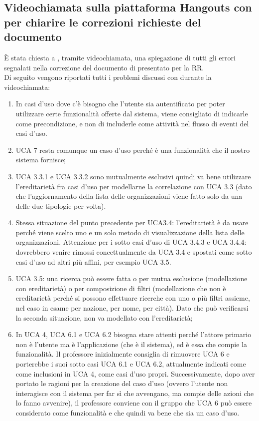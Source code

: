 \subsection{Videochiamata sulla piattaforma Hangouts con \CR{} per chiarire le correzioni richieste del documento }
È stata chiesta a \CR{}, tramite videochiamata, una spiegazione di tutti gli errori segnalati nella correzione del documento di \AdR{} presentato per la RR.\\
Di seguito vengono riportati tutti i problemi discussi con \CR{} durante la videochiamata:
\begin{enumerate}
	\item In casi d'uso dove c'è bisogno che l'utente sia autentificato per poter utilizzare certe funzionalità offerte dal sistema, viene consigliato di indicarle come precondizione, e non di includerle come attività nel flusso di eventi del casi d'uso.
	\item UCA 7 resta comunque un caso d'uso perché è una funzionalità che il nostro sistema fornisce;
	\item UCA 3.3.1 e UCA 3.3.2 sono mutualmente esclusivi quindi va bene utilizzare l'ereditarietà fra casi d'uso per modellarne la correlazione con UCA 3.3
	(dato che l'aggiornamento della lista delle organizzazioni viene fatto solo da una delle due tipologie per volta).
	\item Stessa situazione del punto precedente per UCA3.4: l'ereditarietà è da usare perché viene scelto uno e un solo metodo di visualizzazione della lista delle organizzazioni.
	Attenzione per i sotto casi d'uso di UCA 3.4.3 e UCA 3.4.4: dovrebbero venire rimossi concettualmente da UCA 3.4 e spostati come sotto casi d'uso ad altri più affini, per esempio UCA 3.5.
	\item UCA 3.5: una ricerca può essere fatta o per mutua esclusione (modellazione con ereditarietà) o per composizione di filtri (modellazione che non è ereditarietà perché si possono effettuare ricerche con uno o più filtri assieme, nel caso in esame per nazione, per nome, per città).
	Dato che può verificarsi la seconda situazione, non va modellato con l'ereditarietà;
	\item In UCA 4, UCA 6.1 e UCA 6.2 bisogna stare attenti perché l'attore primario non è l'utente ma è l'applicazione (che è il sistema), ed è essa che compie la funzionalità.
	Il professore inizialmente consiglia di rimuovere UCA 6 e porterebbe i suoi sotto casi UCA 6.1 e UCA 6.2, attualmente indicati come come inclusioni in UCA 4, come casi d'uso propri.
	Successivamente, dopo aver portato le ragioni per la creazione del caso d'uso (ovvero l'utente non interagisce con il sistema per far sì che avvengano, ma compie delle azioni che lo fanno avvenire), il professore conviene con il gruppo che UCA 6 può essere considerato come funzionalità e che quindi va bene che sia un caso d'uso.

\end{enumerate}

